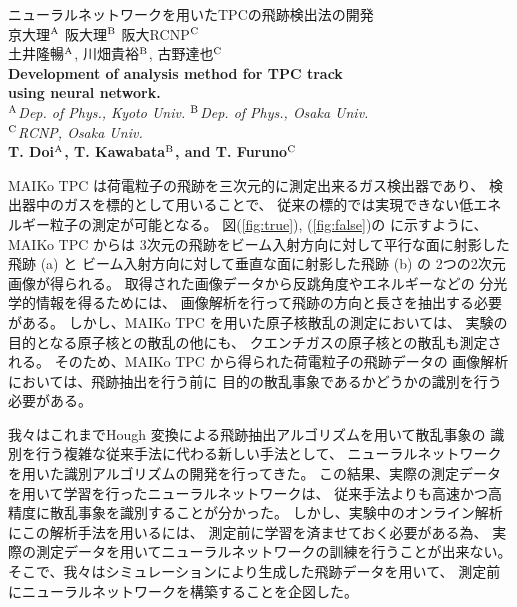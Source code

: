 \documentclass[12pt,a4paper]{jsarticle}
\begin{document}
\vspace{-5pt}
\begin{center}
  {\gt \Large ニューラルネットワークを用いたTPCの飛跡検出法の開発 }\\[14pt]
  
  {\gt \large 京大理$^{\rm{A}}$ 阪大理$^{\rm{B}}$ 阪大RCNP$^{\rm{C}}$\\
    土井隆暢$^{\rm{A}}$, 川畑貴裕$^{\rm{B}}$, 古野達也$^{\rm{C}}$}\\[5pt]
  
  {\large \bf Development of analysis method for TPC track \\
	using neural network.}\\[5pt]
  
  {\large \it $^{\rm{A}}$Dep. of Phys., Kyoto Univ. $^{\rm{B}}$Dep. of Phys., Osaka Univ. \\
    $^{\rm{C}}$RCNP, Osaka Univ.}\\
  
  {\large \bf T. Doi$^{\rm{A}}$, T. Kawabata$^{\rm{B}}$, and T. Furuno$^{\rm{C}}$}
\end{center}

\vspace{5pt}
\small
MAIKo TPC%
は荷電粒子の飛跡を三次元的に測定出来るガス検出器であり、
検出器中のガスを標的として用いることで、
従来の標的では実現できない低エネルギー粒子の測定が可能となる。
図(\ref{fig:true}), (\ref{fig:false})の%
に示すように、MAIKo TPC からは
3次元の飛跡をビーム入射方向に対して平行な面に射影した飛跡 (a) と
ビーム入射方向に対して垂直な面に射影した飛跡 (b) の
2つの2次元画像が得られる。
取得された画像データから反跳角度やエネルギーなどの
分光学的情報を得るためには、
画像解析を行って飛跡の方向と長さを抽出する必要がある。
しかし、MAIKo TPC を用いた原子核散乱の測定においては、
実験の目的となる原子核との散乱の他にも、
クエンチガスの原子核との散乱も測定される。
そのため、MAIKo TPC から得られた荷電粒子の飛跡データの
画像解析においては、飛跡抽出を行う前に
目的の散乱事象であるかどうかの識別を行う必要がある。

我々はこれまでHough 変換による飛跡抽出アルゴリズムを用いて散乱事象の
識別を行う複雑な従来手法に代わる新しい手法として、
ニューラルネットワークを用いた識別アルゴリズムの開発を行ってきた。
この結果、実際の測定データを用いて学習を行ったニューラルネットワークは、
従来手法よりも高速かつ高精度に散乱事象を識別することが分かった。
しかし、実験中のオンライン解析にこの解析手法を用いるには、
測定前に学習を済ませておく必要がある為、
実際の測定データを用いてニューラルネットワークの訓練を行うことが出来ない。
そこで、我々はシミュレーションにより生成した飛跡データを用いて、
測定前にニューラルネットワークを構築することを企図した。
\end{document}

